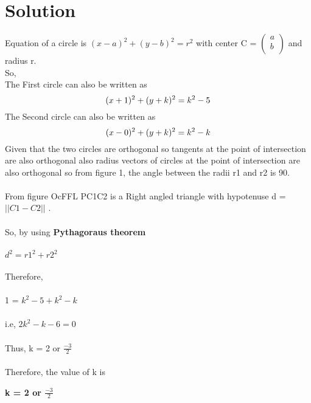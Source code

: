 \documentclass[journal,12pt,twocolumn]{IEEEtran}
\newlength\triwidth
\newcommand\tridelt[1]{%
  \setlength\triwidth{\widthof{#1\ }}%
  \stackengine{-.1\triwidth}{#1\ }%
    {\scaleto{\Delta}{1\triwidth}}{O}{c}{F}{F}{L}%
}
\begin{document}
\section{Solution}
Equation of a circle is $(x-a)^2 + (y-b)^2 = r^2$ with center C = $\begin{pmatrix}
    a \\
    b \\
\end{pmatrix}$
and radius r.\\
So,\\
The First circle can also be written as \\
\begin{equation}
    (x + 1)^2 + (y + k)^2 = k^2 - 5 \\
    \label{eq-1}
\end{equation}
The Second circle can also be written as \\
\begin{equation}
    (x - 0)^2 + (y + k)^2 = k^2 - k \\
    \label{eq-2}
\end{equation}
Given that the two circles are orthogonal so tangents at the point of intersection are also orthogonal also radius vectors of circles at the point of intersection are also orthogonal so from figure 1, the angle between the radii r1 and r2 is 90\textdegree.  \\
\\
From figure \tridelt.PC1C2 is a Right angled triangle with hypotenuse d = $||C1-C2||$ .  \\
\\
So, by using \textbf{Pythagoraus theorem}  \\
\\
$d^{2} = r1^{2} + r2^{2}$ \\
\\
Therefore,\\
\\
1 = $k^{2}-5+k^{2}-k$\\
\\
i.e, $2k^{2}-k-6 = 0$ \\
\\
Thus, k = 2 or $\frac{-3}{2}$ \\
\\
Therefore, the value of k is \\
\begin{center}
    \textbf{k = 2 or $\frac{-3}{2}$}\\
\end{center}
\end{document}
